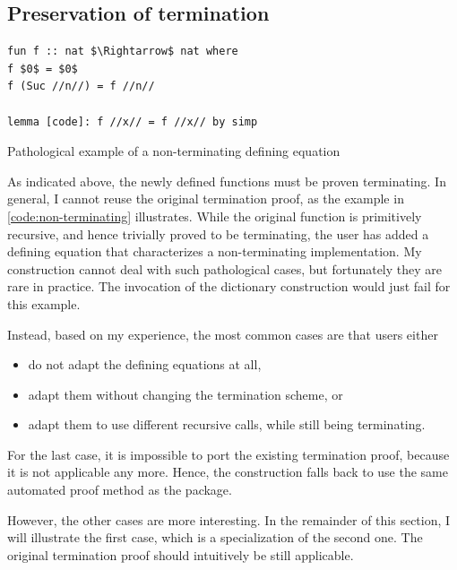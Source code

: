 \subsection{Preservation of termination}
\label{sec:preproc:dict:termination}

\begin{code}[t]
  \begin{lstlisting}
fun f :: nat $\Rightarrow$ nat where
f $0$ = $0$
f (Suc //n//) = f //n//

lemma [code]: f //x// = f //x// by simp\end{lstlisting}
  \caption{Pathological example of a non-terminating defining equation}
  \label{code:non-terminating}
\end{code}

As indicated above, the newly defined functions must be proven terminating.
In general, I cannot reuse the original termination proof, as the example in \cref{code:non-terminating} illustrates.
While the original function is primitively recursive, and hence trivially proved to be terminating, the user has added a defining equation that characterizes a non-terminating implementation.
My construction cannot deal with such pathological cases, but fortunately they are rare in practice.
The invocation of the dictionary construction would just fail for this example.

Instead, based on my experience, the most common cases are that users either
\begin{itemize}
  \item do not adapt the defining equations at all,
  \item adapt them without changing the termination scheme, or
  \item adapt them to use different recursive calls, while still being terminating.
\end{itemize}

\noindent
For the last case, it is impossible to port the existing termination proof, because it is not applicable any more.
Hence, the construction falls back to use the same automated proof method as the  package.

However, the other cases are more interesting.
In the remainder of this section, I will illustrate the first case, which is a specialization of the second one.%
The original termination proof should intuitively be still applicable.

